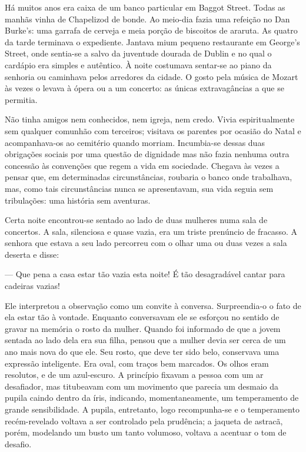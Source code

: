 Há muitos anos era caixa de um banco particular em Baggot Street.
Todas as manhãs vinha de Chapelizod de bonde. Ao meio-dia fazia uma
refeição no Dan Burke's: uma garrafa de cerveja e meia porção de
biscoitos de araruta. As quatro da tarde terminava o expediente.
Jantava mium pequeno restaurante em George's Street, onde sentia-se a
salvo da juventude dourada de Dublin e no qual o cardápio era
simples e autêntico. À noite
costumava sentar-se ao piano da senhoria ou caminhava pelos arredores
da cidade. O gosto pela música de Mozart às vezes o levava à ópera ou
a um concerto: as únicas extravagâncias a que se permitia.

Não tinha amigos nem conhecidos, nem igreja, nem credo. Vivia
espiritualmente sem qualquer comunhão com terceiros; visitava os
parentes por ocasião do Natal e acompanhava-os ao cemitério quando
morriam. Incumbia-se dessas duas obrigações sociais por uma questão de
dignidade mas não fazia nenhuma outra concessão às convenções que
regem a vida em sociedade. Chegava às vezes a pensar que, em
determinadas circunstâncias, roubaria o banco onde trabalhava, mas,
como tais circunstâncias nunca se apresentavam, sua vida seguia sem
tribulações: uma história sem aventuras.

Certa noite encontrou-se sentado ao lado de duas mulheres numa sala de
concertos. A sala, silenciosa e quase vazia, era um triste prenúncio
de fracasso. A senhora que estava a seu lado percorreu com o olhar uma
ou duas vezes a sala deserta e disse:

--- Que pena a casa estar tão vazia esta noite! É tão desagradável
cantar para cadeiras vazias!

Ele interpretou a observação como um convite à conversa. Surpreendia-o
o fato de ela estar tão à vontade. Enquanto conversavam ele se
esforçou no sentido de gravar na memória o rosto da mulher. Quando
foi informado de que a jovem sentada ao lado dela era sua filha,
pensou que a mulher devia ser cerca de um ano mais nova do que ele.
Seu rosto, que deve ter sido belo, conservava uma expressão
inteligente. Era oval, com traços bem marcados. Os olhos eram
resolutos, e de um azul-escuro. A princípio fixavam a pessoa com um ar
desafiador, mas titubeavam com um movimento que parecia um desmaio
da pupila caindo dentro da íris, indicando, momentaneamente, um
temperamento de grande sensibilidade. A pupila, entretanto, logo
recompunha-se e o temperamento recém-revelado voltava a ser
controlado pela prudência; a jaqueta de astracã, porém, modelando um
busto um tanto volumoso, voltava a acentuar o tom de desafio.

